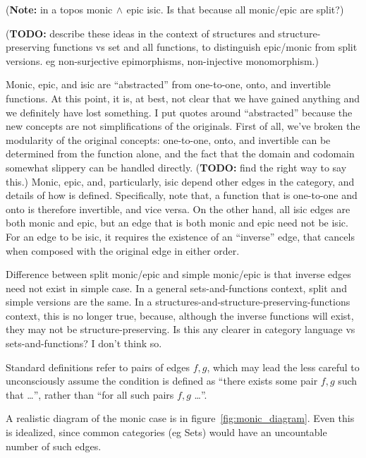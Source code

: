 \documentclass[11pt,openany]{book}
\begin{document}
(\textbf{Note:} in a topos monic$\,\wedge\,$epic \implies isic.
Is that because all monic/epic are split?)

(\textbf{TODO:} describe these ideas in the context of
structures and structure-preserving functions vs
set and all functions, to distinguish epic/monic from split versions.
eg non-surjective epimorphisms, non-injective monomorphism.)

Monic, epic, and isic are ``abstracted'' 
from one-to-one, onto, and invertible functions.
At this point, it is, at best, not clear that we have gained
anything and we definitely have lost something.
I put quotes around ``abstracted'' because the new concepts are
not simplifications of the originals.
First of all, 
we've broken the modularity of the original concepts:
one-to-one, onto, and invertible can be determined from
the function alone, and the fact that the domain and codomain
somewhat slippery can be handled directly.
(\textbf{TODO:} find the right way to say this.)
Monic, epic, and, particularly, isic depend other edges in the category, 
and details of how \compose is defined.
Specifically, note that,
a function that is one-to-one and onto is
therefore invertible, and vice versa.
On the other hand, all isic edges are both monic and epic,
but an edge that is both monic and epic need not be isic.
For an edge to be isic, it requires the existence of an ``inverse''
edge, that cancels when composed with the original edge 
in either order.

Difference between split monic/epic and simple monic/epic
is that inverse edges need not exist in simple case.
In a general sets-and-functions context, split and simple versions
are the same.
In a structures-and-structure-preserving-functions context,
this is no longer true, because, although the inverse functions
will exist, they may not be structure-preserving.
Is this any clearer in category language vs sets-and-functions?
I don't think so.


Standard definitions refer to pairs of edges $f, g$,
which may lead the less careful to unconsciously assume
the condition is defined as 
``there exists some pair $f,g$ such that \ldots'',
rather than
``for all such pairs $f,g$ \ldots''.

A realistic diagram of the monic case 
is in figure~\ref{fig:monic_diagram}.
Even this is idealized, since common categories (eg Sets)
would have an uncountable number of such edges.
\end{document}
